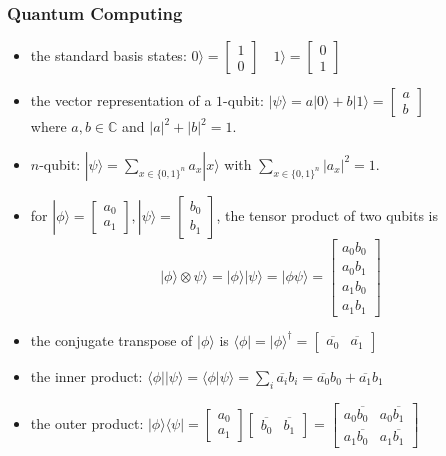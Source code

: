 \documentclass[UTF8,aspectratio=43,11pt,colorlinks,compress,openany]{beamer}%
\begin{document}
\begin{frame}\frametitle{Quantum Computing}
\setlength\abovedisplayskip{0pt}
\setlength\belowdisplayskip{0pt}
	\begin{itemize}
		\item the standard basis states: $0\rangle=
		\begin{bmatrix}
			1\\
			0
		\end{bmatrix}\quad 1\rangle=
		\begin{bmatrix}
			0\\
			1
		\end{bmatrix}$
		\item the vector representation of a $1$-qubit: $|\psi\rangle = a|0\rangle +b|1\rangle = \begin{bmatrix}a\\b\end{bmatrix}$\\
		where $a,b\in\mathbb{C}$ and $|a|^2+|b|^2=1$.
		\item $n$-qubit: $|\psi\rangle = \sum\limits_{x\in\{0,1\}^n}a_x|x\rangle$ with $\sum\limits_{x\in\{0,1\}^n}|a_x|^2=1$.
		\item for $|\phi\rangle = \begin{bmatrix}a_0\\a_1\end{bmatrix}, |\psi\rangle = \begin{bmatrix}b_0\\b_1\end{bmatrix}$, the tensor product of two qubits is
		\[|\phi\rangle\otimes \psi\rangle=|\phi\rangle|\psi\rangle=|\phi\psi\rangle=\begin{bmatrix}
			a_0b_0\\
			a_0b_1\\
			a_1b_0\\
			a_1b_1
		\end{bmatrix}\]
		\item the conjugate transpose of $|\phi\rangle$ is $\langle \phi|=|\phi\rangle^\dagger=\begin{bmatrix}
			\overline{a_0} &\overline{a_1}
		\end{bmatrix}$
		\item the inner product: $\langle \phi||\psi\rangle=\langle \phi|\psi\rangle=\sum_i\overline{a_i}b_i=\overline{a_0}b_0+\overline{a_1}b_1$
		\item the outer product: $|\phi\rangle\langle \psi|=
		\begin{bmatrix}
			a_0\\
			a_1
		\end{bmatrix}
		\begin{bmatrix}
			\overline{b_0} &\overline{b_1}
		\end{bmatrix}=
		\begin{bmatrix}
			a_0\overline{b_0} &a_0\overline{b_1}\\
			a_1\overline{b_0} &a_1\overline{b_1}
		\end{bmatrix}$
	\end{itemize}
\end{frame}
\end{document}
